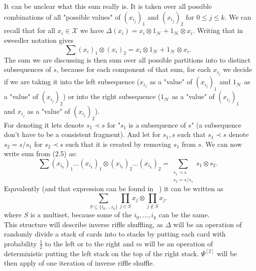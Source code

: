 \documentclass[a4paper, 12pt]{report}
\begin{document}
It can be unclear what this sum really is. It is taken over all possible combinations of all "possible
values" of $(x_{i_j})_1$ and $(x_{i_j})_2$ for $ 0 \leq j \leq k$. We can recall that for all
$x_i \in \mathcal{X}$ we
have $\Delta(x_i) = x_i \otimes 1_\mathcal{H} + 1_\mathcal{H} \otimes x_i$. Writing that in sweedler
notation gives
\begin{equation*}
\sum(x_i)_1 \otimes (x_i)_2 = x_i \otimes 1_\mathcal{H} + 1_\mathcal{H} \otimes x_i.
\end{equation*}
The sum we are discussing is then sum over all possible partitions into to distinct subsequences of $s$,
because for each component of that sum, for each $x_{i_j}$ we decide if we are taking it into the left
subsequence ($x_{i_j}$ as a "value" of $(x_{i_j})_1$ and $1_\mathcal{H}$ as a "value" of $(x_{i_j})_2$) or
into the right subsequence ($1_\mathcal{H}$ as a "value" of $(x_{i_j})_1$ and $x_{i_j}$ as a "value" of
$(x_{i_j})_2$).
\\ For denoting it lets denote $s_1 \prec s$ for "$s_1$ is a subsequence of $s$" (a subsequence don't have
to be a consistent fragment). And let for $s_1, s$
such that $s_1 \prec s$ denote $s_2 = s / s_1$ for $s_2 \prec s$ such that it is created by removing
$s_1$ from $s$. We can now write sum from (2.5) as:
\begin{equation*}
\sum (x_{i_0})_1 \dots (x_{i_k})_1 \otimes (x_{i_0})_2 \dots (x_{i_k})_2 =
\sum_{\substack{s_1 \prec s \\ s_2 = s / s_1}} s_1 \otimes s_2.
\end{equation*}
Equvalently (and that expression can be found in ~\cite{Diaconis2014}) it can be written as
\begin{equation*}
\sum_{S \subseteq \{ i_0, \dots i_k \} } \prod_{j \in S} x_j \otimes \prod_{j \notin S} x_j.
\end{equation*}
where $S$ is a multiset, because some of the $i_0, \dots, i_k$ can be the same. \\
\indent This structure will describe inverse riffle shuffling, as $\Delta$ will be an operation of
randomly divide a stack of cards into to stacks by putting each card with probability $\frac{1}{2}$ to
the left or to the right and $m$ will be an operation of deterministic putting the left stack on the top
of the right stack. $\Psi^{[2]}$ will be then apply of one iteration of inverse riffle shuffle.
\end{document}
